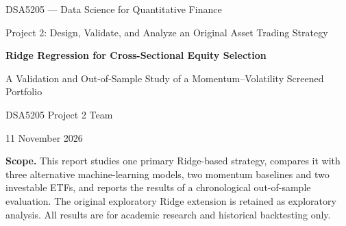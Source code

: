 \documentclass[11pt,a4paper]{article}
\begin{document}
\begin{titlepage}
\centering
\vspace*{1.4cm}
{\small DSA5205 --- Data Science for Quantitative Finance\par}
\vspace{0.4cm}
{\small Project 2: Design, Validate, and Analyze an Original Asset Trading Strategy\par}
\vspace{2.2cm}
{\LARGE\bfseries Ridge Regression for Cross-Sectional Equity Selection\par}
\vspace{0.6cm}
{\Large A Validation and Out-of-Sample Study of a Momentum--Volatility Screened Portfolio\par}
\vspace{2.2cm}
{\large DSA5205 Project 2 Team\par}
\vspace{1.4cm}
{\normalsize 11 November 2026\par}
\vfill
\begin{minipage}{0.86\textwidth}
\small
\textbf{Scope.} This report studies one primary Ridge-based strategy, compares it with three alternative machine-learning models, two momentum baselines and two investable ETFs, and reports the results of a chronological out-of-sample evaluation. The original exploratory Ridge extension is retained as exploratory analysis. All results are for academic research and historical backtesting only.
\end{minipage}
\vspace{1.2cm}
\end{titlepage}
\end{document}
